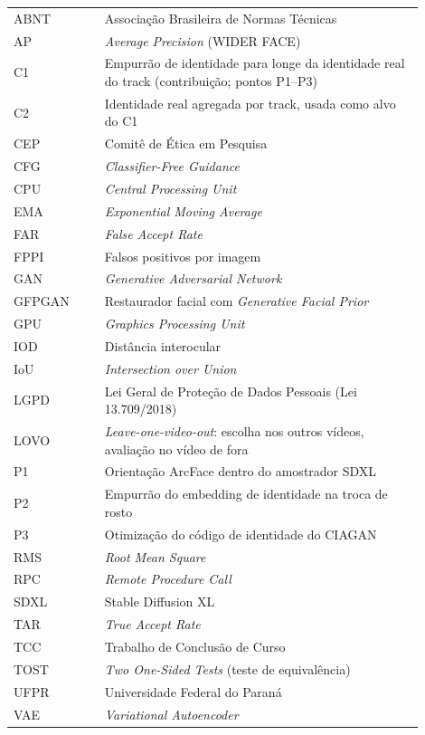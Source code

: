 

\begin{listaacron}

\begin{longtable}[l]{p{0.2\linewidth}p{0.7\linewidth}}
ABNT & Associação Brasileira de Normas Técnicas\\
AP & \emph{Average Precision} (WIDER FACE)\\
C1 & Empurrão de identidade para longe da identidade real do track (contribuição; pontos P1--P3)\\
C2 & Identidade real agregada por track, usada como alvo do C1\\
CEP & Comitê de Ética em Pesquisa\\
CFG & \emph{Classifier-Free Guidance}\\
CPU & \emph{Central Processing Unit}\\
EMA & \emph{Exponential Moving Average}\\
FAR & \emph{False Accept Rate}\\
FPPI & Falsos positivos por imagem\\
GAN & \emph{Generative Adversarial Network}\\
GFPGAN & Restaurador facial com \emph{Generative Facial Prior}\\
GPU & \emph{Graphics Processing Unit}\\
IOD & Distância interocular\\
IoU & \emph{Intersection over Union}\\
LGPD & Lei Geral de Proteção de Dados Pessoais (Lei 13.709/2018)\\
LOVO & \emph{Leave-one-video-out}: escolha nos outros vídeos, avaliação no vídeo de fora\\
P1 & Orientação ArcFace dentro do amostrador SDXL\\
P2 & Empurrão do embedding de identidade na troca de rosto\\
P3 & Otimização do código de identidade do CIAGAN\\
RMS & \emph{Root Mean Square}\\
RPC & \emph{Remote Procedure Call}\\
SDXL & Stable Diffusion XL\\
TAR & \emph{True Accept Rate}\\
TCC & Trabalho de Conclusão de Curso\\
TOST & \emph{Two One-Sided Tests} (teste de equivalência)\\
UFPR & Universidade Federal do Paraná\\
VAE & \emph{Variational Autoencoder}\\
\end{longtable}

\end{listaacron}

